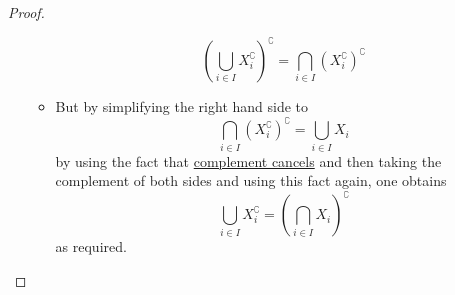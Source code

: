 \begin{proof}
\begin{itemize}
\begin{itemize}
\[                    \left( \bigcup _{  i \in  I }  X_{i}^ {\complement}
                    \right)^{\complement} = \bigcap _{  i \in  I }  \left( X_{i}
                    ^ {\complement} \right)^{\complement} 
                \]
            \item But by simplifying the right hand side to
                \[
                \bigcap _{ i \in  I }  \left( X_{i} ^ {\complement}
                \right)^{\complement}  =  \bigcup _{  i \in  I }  X _{i}
                \]
                by using the fact that
                \hyperref[proposition:complement_cancels]{complement cancels}
                and then taking the complement of both sides and using this fact
                again, one obtains
            \[
            \bigcup _{  i \in  I }  X_{i} ^{\complement} = \left( \bigcap _{  i
            \in  I }  X_{i} \right) ^{\complement}
            \]
            as required.
        \end{itemize}
    \end{itemize}
\end{proof}
